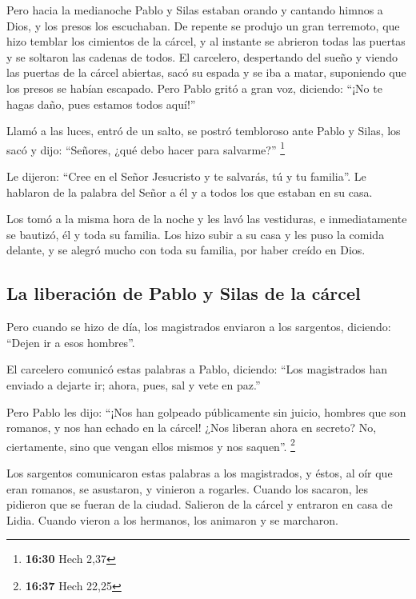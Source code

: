  Pero hacia la medianoche Pablo y Silas estaban orando y
cantando himnos a Dios, y los presos los escuchaban.  De
repente se produjo un gran terremoto, que hizo temblar los cimientos de
la cárcel, y al instante se abrieron todas las puertas y se soltaron las
cadenas de todos.  El carcelero, despertando del sueño y
viendo las puertas de la cárcel abiertas, sacó su espada y se iba a
matar, suponiendo que los presos se habían escapado. 
Pero Pablo gritó a gran voz, diciendo: ``¡No te hagas daño, pues estamos
todos aquí!''

 Llamó a las luces, entró de un salto, se postró
tembloroso ante Pablo y Silas,  los sacó y dijo:
``Señores, ¿qué debo hacer para salvarme?'' \footnote{\textbf{16:30}
  Hech 2,37}

 Le dijeron: ``Cree en el Señor Jesucristo y te salvarás,
tú y tu familia''.  Le hablaron de la palabra del Señor a
él y a todos los que estaban en su casa.

 Los tomó a la misma hora de la noche y les lavó las
vestiduras, e inmediatamente se bautizó, él y toda su familia.
 Los hizo subir a su casa y les puso la comida delante, y
se alegró mucho con toda su familia, por haber creído en Dios.

\hypertarget{la-liberaciuxf3n-de-pablo-y-silas-de-la-cuxe1rcel}{%
\subsection{La liberación de Pablo y Silas de la
cárcel}\label{la-liberaciuxf3n-de-pablo-y-silas-de-la-cuxe1rcel}}

 Pero cuando se hizo de día, los magistrados enviaron a
los sargentos, diciendo: ``Dejen ir a esos hombres''.

 El carcelero comunicó estas palabras a Pablo, diciendo:
``Los magistrados han enviado a dejarte ir; ahora, pues, sal y vete en
paz.''

 Pero Pablo les dijo: ``¡Nos han golpeado públicamente
sin juicio, hombres que son romanos, y nos han echado en la cárcel! ¿Nos
liberan ahora en secreto? No, ciertamente, sino que vengan ellos mismos
y nos saquen''. \footnote{\textbf{16:37} Hech 22,25}

 Los sargentos comunicaron estas palabras a los
magistrados, y éstos, al oír que eran romanos, se asustaron,
 y vinieron a rogarles. Cuando los sacaron, les pidieron
que se fueran de la ciudad.  Salieron de la cárcel y
entraron en casa de Lidia. Cuando vieron a los hermanos, los animaron y
se marcharon.

